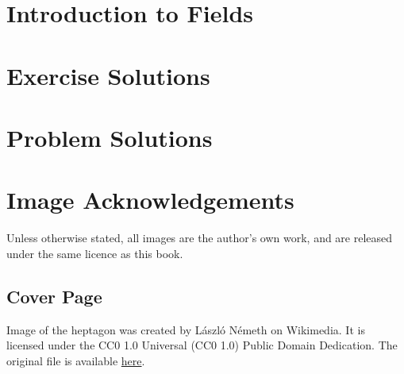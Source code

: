 
\usepackage{xr}

\newcommand{\version}{0.1}
\newcommand{\volumenumber}{3}
\newcommand{\volumename}{Fields}
\newcommand{\volumeimage}{cover/Regular Heptagon.png}

\newcommand{\quotepagetext}{
    I became convinced that studying the algebraic relationship of numbers is most conveniently based on a concept that is directly connected with the simplest arithmetic properties. I had originally used the term ``rational domain'', which I later changed to ``field''.
}
\newcommand{\quotepageattribution}{Richard Dedekind, 1871}
\newcommand{\quotepagecitation}{\cite[p.~66]{kleiner_2007}}

\newcommand{\prefacevolumetext}{
    We cover field theory essentials in Volume III. %
}

\linespread{1.05}




\frontmatterpages  %

\chapter{Introduction to Fields}

\appendix
\chapter{Exercise Solutions}

\chapter{Problem Solutions}

\chapter{Image Acknowledgements}
Unless otherwise stated, all images are the author's own work, and are released under the same licence as this book.

\section{Cover Page}
Image of the heptagon was created by L\'{a}szl\'{o} N\'{e}meth on Wikimedia. It is licensed under the CC0 1.0 Universal (CC0 1.0) Public Domain Dedication. The original file is available \href{https://commons.wikimedia.org/wiki/File:Regular_polygon_7_annotated.svg}{here}.

\printbibliography[heading=bibintoc, title={References and Bibliography}]


